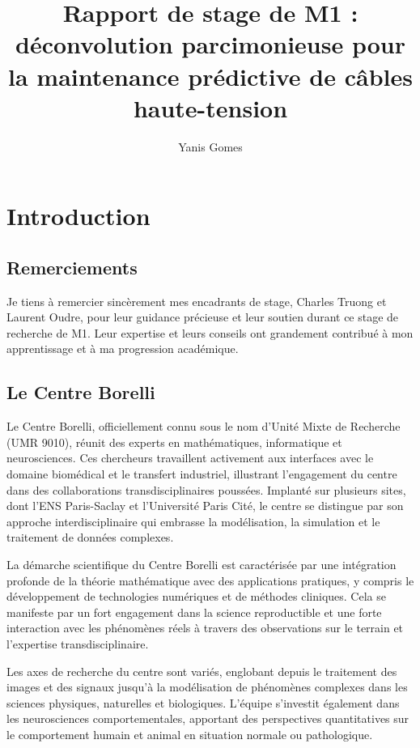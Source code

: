\documentclass[9pt,a4paper,twoside]{rho}
\title{Rapport de stage de M1 : déconvolution parcimonieuse pour la maintenance prédictive de câbles haute-tension}
\author[1]{Yanis Gomes}
\affil[1]{Ecole Normale Supérieure de Paris-Saclay}
\begin{document}
	
\maketitle
\thispagestyle{firststyle}



\section{Introduction}

\subsection{Remerciements}
Je tiens à remercier sincèrement mes encadrants de stage, Charles Truong et Laurent Oudre, pour leur guidance précieuse et leur soutien durant ce stage de recherche de M1. Leur expertise et leurs conseils ont grandement contribué à mon apprentissage et à ma progression académique.

\subsection{Le Centre Borelli}
Le Centre Borelli, officiellement connu sous le nom d'Unité Mixte de Recherche (UMR 9010), réunit des experts en mathématiques, informatique et neurosciences. 
Ces chercheurs travaillent activement aux interfaces avec le domaine biomédical et le transfert industriel, illustrant l'engagement du centre dans des collaborations transdisciplinaires poussées. 
Implanté sur plusieurs sites, dont l’ENS Paris-Saclay et l’Université Paris Cité, le centre se distingue par son approche interdisciplinaire qui embrasse la modélisation, la simulation et le traitement de données complexes.

La démarche scientifique du Centre Borelli est caractérisée par une intégration profonde de la théorie mathématique avec des applications pratiques, y compris le développement de technologies numériques et de méthodes cliniques. 
Cela se manifeste par un fort engagement dans la science reproductible et une forte interaction avec les phénomènes réels à travers des observations sur le terrain et l'expertise transdisciplinaire.

Les axes de recherche du centre sont variés, englobant depuis le traitement des images et des signaux jusqu'à la modélisation de phénomènes complexes dans les sciences physiques, naturelles et biologiques. 
L'équipe s'investit également dans les neurosciences comportementales, apportant des perspectives quantitatives sur le comportement humain et animal en situation normale ou pathologique.
\end{document}
